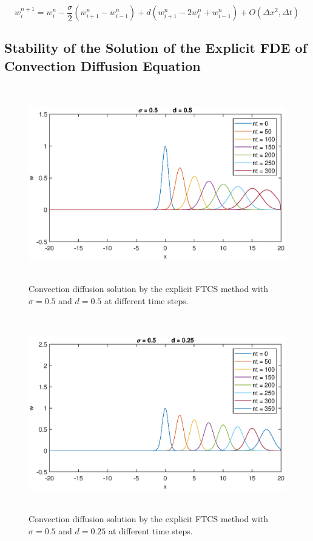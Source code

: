 \documentclass[letterpaper,12pt]{article}
\begin{document}
\begin{equation}
	w_{i}^{n+1}= w_{i}^{n}-\frac{\sigma}{2}(w_{i+1}^{n}-w_{i-1}^{n})+d(w_{i+1}^{n}-2w_{i}^{n}+w_{i-1}^{n})+O(\Delta x^2,\Delta t) 
	\tag*{(11)}
\end{equation}

\vspace{1cm}

\subsection{Stability of the Solution of the Explicit FDE of Convection Diffusion Equation}
\begin{figure}[!ht] 
	\centering 
	\includegraphics[max height=8.5cm]{graphs/FTCS/ConvectionDiffusion/sigma05d05.eps}
	\caption{Convection diffusion solution by the explicit FTCS method with $\sigma= 0.5$ and $d=0.5$ at different time steps.}
 	\label{fig:FTCSsigma05d05}
\end{figure}
\begin{figure}[!ht] 
	\centering 
	\includegraphics[max height=8.5cm]{graphs/FTCS/ConvectionDiffusion/sigma05d025.eps}
	\caption{Convection diffusion solution by the explicit FTCS method with $\sigma= 0.5$ and $d=0.25$ at different time steps.}
	 \label{fig:FTCSsigma05d025}
\end{figure}
\end{document}
